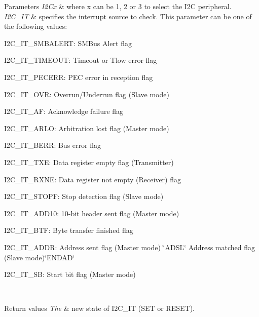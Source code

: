 \begin{DoxyParams}{Parameters}
{\em I2\+Cx} & where x can be 1, 2 or 3 to select the I2C peripheral. \\
\hline
{\em I2\+C\+\_\+\+IT} & specifies the interrupt source to check. This parameter can be one of the following values\+: \begin{DoxyItemize}
\item I2\+C\+\_\+\+I\+T\+\_\+\+S\+M\+B\+A\+L\+E\+RT\+: S\+M\+Bus Alert flag \item I2\+C\+\_\+\+I\+T\+\_\+\+T\+I\+M\+E\+O\+UT\+: Timeout or Tlow error flag \item I2\+C\+\_\+\+I\+T\+\_\+\+P\+E\+C\+E\+RR\+: P\+EC error in reception flag \item I2\+C\+\_\+\+I\+T\+\_\+\+O\+VR\+: Overrun/\+Underrun flag (Slave mode) \item I2\+C\+\_\+\+I\+T\+\_\+\+AF\+: Acknowledge failure flag \item I2\+C\+\_\+\+I\+T\+\_\+\+A\+R\+LO\+: Arbitration lost flag (Master mode) \item I2\+C\+\_\+\+I\+T\+\_\+\+B\+E\+RR\+: Bus error flag \item I2\+C\+\_\+\+I\+T\+\_\+\+T\+XE\+: Data register empty flag (Transmitter) \item I2\+C\+\_\+\+I\+T\+\_\+\+R\+X\+NE\+: Data register not empty (Receiver) flag \item I2\+C\+\_\+\+I\+T\+\_\+\+S\+T\+O\+PF\+: Stop detection flag (Slave mode) \item I2\+C\+\_\+\+I\+T\+\_\+\+A\+D\+D10\+: 10-\/bit header sent flag (Master mode) \item I2\+C\+\_\+\+I\+T\+\_\+\+B\+TF\+: Byte transfer finished flag \item I2\+C\+\_\+\+I\+T\+\_\+\+A\+D\+DR\+: Address sent flag (Master mode) \char`\"{}\+A\+D\+S\+L\char`\"{} Address matched flag (Slave mode)\char`\"{}\+E\+N\+D\+A\+D\char`\"{} \item I2\+C\+\_\+\+I\+T\+\_\+\+SB\+: Start bit flag (Master mode) \end{DoxyItemize}
\\
\hline
\end{DoxyParams}

\begin{DoxyRetVals}{Return values}
{\em The} & new state of I2\+C\+\_\+\+IT (S\+ET or R\+E\+S\+ET). \\
\hline
\end{DoxyRetVals}
\mbox{\label{group___i2_c___group5_ga29237aea9b5a3ead33167e1d027e9f1a}} 
